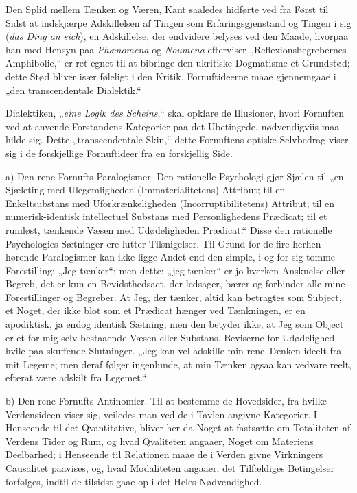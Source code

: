 \documentclass[12pt]{book}
\newcommand{\opage}[1]{\marginnote{\footnotesize\textit{[#1]}}}
\begin{document}
Den Splid mellem Tænken og Væren, Kant saaledes hidførte ved fra Først til Sidst at
indskjærpe Adskillelsen af Tingen som Erfaringsgjenstand og Tingen i sig
(\textit{das Ding an sich}), en Adskillelse, der endvidere belyses ved den Maade,
hvorpaa han med Hensyn paa \textit{Phænomena} og \textit{Noumena} efterviser
„Reflexionsbegrebernes Amphibolie,“ er ret egnet til at bibringe den ukritiske
Dogmatisme et Grundstød; dette Stød bliver især føleligt i den Kritik,
Fornuftideerne maae gjennemgaae i „den transcendentale Dialektik.“

Dialektiken, „\textit{eine Logik des Scheins},“ skal opklare de Illusioner, hvori
Fornuften ved at anvende Forstandens Kategorier paa det Ubetingede, nødvendigviis
maa hilde sig. Dette „transcendentale Skin,“ dette Fornuftens optiske Selvbedrag
viser sig i de forskjellige Fornuftideer fra en forskjellig Side.

a) Den rene Fornufts Paralogismer. Den rationelle Psychologi gjør Sjælen til „en
Sjæleting med Ulegemligheden (Immaterialitetens) Attribut; til en Enkeltsubstans
med Uforkrænkeligheden (Incorruptibilitetens) Attribut; til en numerisk-identisk
intellectuel Substans med Personlighedens
\opage{29} Prædicat; til et rumløst, tænkende Væsen med Udødeligheden Prædicat.“ Disse den
rationelle Psychologies Sætninger ere lutter Tilsnigelser. Til Grund for de fire
herhen hørende Paralogismer kan ikke ligge Andet end den simple, i og for sig tomme
Forestilling: „Jeg tænker“; men dette: „jeg tænker“ er jo hverken Anskuelse eller
Begreb, det er kun en Bevidsthedsact, der ledsager, bærer og forbinder alle mine
Forestillinger og Begreber. At Jeg, der tænker, altid kan betragtes som Subject, et
Noget, der ikke blot som et Prædicat hænger ved Tænkningen, er en apodiktisk, ja
endog identisk Sætning; men den betyder ikke, at Jeg som Object er et for mig selv
bestaaende Væsen eller Substans. Beviserne for Udødelighed hvile paa skuffende
Slutninger. „Jeg kan vel adskille min rene Tænken ideelt fra mit Legeme; men deraf
følger ingenlunde, at min Tænken ogsaa kan vedvare reelt, efterat være adskilt fra
Legemet.“

b) Den rene Fornufts Antinomier. Til at bestemme de Hovedsider, fra hvilke
Verdensideen viser sig, veiledes man ved de i Tavlen angivne Kategorier. I Henseende
til det Qvantitative, bliver her da Noget at fastsætte om Totaliteten af Verdens
Tider og Rum, og hvad Qvaliteten angaaer, Noget om Materiens Deelbarhed; i Henseende
til Relationen maae de i Verden givne Virkningers Causalitet paavises, og, hvad
Modaliteten angaaer, det Tilfældiges Betingelser forfølges, indtil de tilsidst gaae
op i det Heles Nødvendighed.
\end{document}
